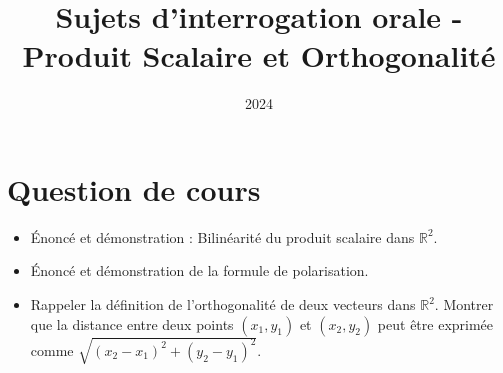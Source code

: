 \documentclass[10pt,a4paper]{article}
\title{Sujets d'interrogation orale - Produit Scalaire et Orthogonalité}
\author{}
\date{2024}
\begin{document}
\maketitle

\section*{Question de cours}
\begin{itemize}
    \item Énoncé et démonstration : Bilinéarité du produit scalaire dans $\mathbb{R}^2$.
    \item Énoncé et démonstration de la formule de polarisation.
    \item Rappeler la définition de l'orthogonalité de deux vecteurs dans $\mathbb{R}^2$.
    Montrer que la distance entre deux points $(x_1, y_1)$ et $(x_2, y_2)$ peut être exprimée comme $\sqrt{(x_2 - x_1)^2 + (y_2 - y_1)^2}$.
\end{itemize}
\end{document}
